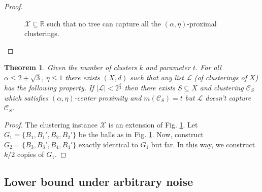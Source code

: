 \documentclass[12pt]{article}
\newtheorem{theorem}{Theorem}
\newcommand{\mc}{\mathcal}
\begin{document}
\begin{proof}
\begin{figure}[!t]
\begin{center}
\end{center}
\vspace{-1cm}
\caption{$\mc X \subseteq \mathbb{R}$ such that no tree can capture all the $(\alpha, \eta)$-proximal clusterings.}
\label{fig:noalgalphacp}
\end{figure}
\end{proof}

\begin{theorem}
\label{thm:nolistalphacp}
Given the number of clusters $k$ and parameter $t$. For all $\alpha \le 2+\sqrt{3}$, $\eta \le 1$ there exists $(X, d)$ such that any list $\mc L$ (of clusterings of $X$) has  the following property. If $|\mc L| < 2^{\frac{k}{2}}$ then there exists $S \subseteq X$ and clustering $\mc C_{S}$ which satisfies $(\alpha, \eta)$-center proximity and $ m(\mc C_{S}) = t$ but $\mc L$ doesn't capture $\mc C_{S}$.
\end{theorem}
\begin{proof}
The clustering instance $\mc X$ is an extension of Fig. \ref{fig:noalgalphacp}. Let  $G_1 = \{B_1, B_1', B_2, B_2'\}$ be the balls as in Fig. \ref{fig:noalgalphacp}. Now, construct $G_2 = \{B_3, B_3', B_4, B_4'\}$ exactly identical to $G_1$ but far. In this way, we construct $k/2$ copies of $G_1$.
\end{proof}

\subsection{Lower bound under arbitrary noise}
\label{section:alphaLowerBoundArbitrary}
\end{document}

